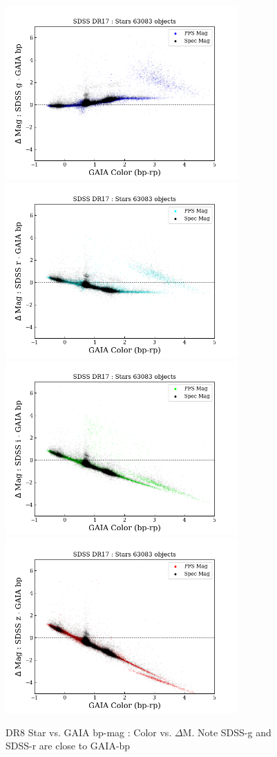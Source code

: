 \documentclass[apj,twocolumn]{aastex631}
\begin{document}
\begin{figure}%
\begin{center}
\includegraphics[angle=0,width=8.9cm]{figures/20220812_color_dmag_g_bp_dr17star.png}
\includegraphics[angle=0,width=8.9cm]{figures/20220812_color_dmag_r_bp_dr17star.png}
\includegraphics[angle=0,width=8.9cm]{figures/20220812_color_dmag_i_bp_dr17star.png}
\includegraphics[angle=0,width=8.9cm]{figures/20220812_color_dmag_z_bp_dr17star.png}
\caption{DR8 Star vs. GAIA bp-mag : Color vs. $\Delta$M.  Note SDSS-g and SDSS-r are close to GAIA-bp}
\end{center}
\end{figure}
\end{document}
